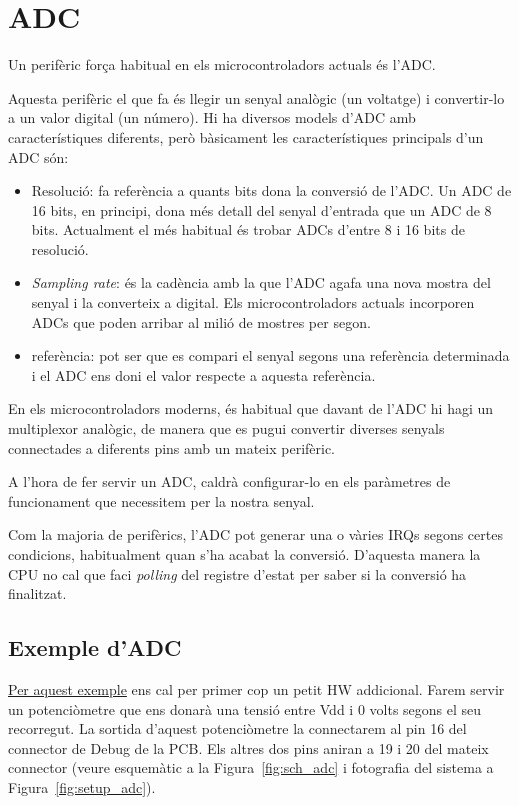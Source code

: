 \chapter{ADC}
\label{sub:ADC}
Un perifèric força habitual en els microcontroladors actuals és l'\gls{ADC}.

Aquesta perifèric el que fa és llegir un senyal analògic (un voltatge) i convertir-lo a un valor digital (un número). Hi ha diversos models d'\gls{ADC} amb característiques diferents, però bàsicament les característiques principals d'un ADC són:
\begin{itemize}
 \item Resolució: fa referència a quants bits dona la conversió de l'ADC. Un ADC de 16 bits, en principi, dona més detall del senyal d'entrada que un ADC de 8 bits. Actualment el més habitual és trobar ADCs d'entre 8 i 16 bits de resolució.
 \item {\em Sampling rate}: és la cadència amb la que l'ADC agafa una nova mostra del senyal i la converteix a digital. Els microcontroladors actuals incorporen ADCs que poden arribar al milió de mostres per segon.
 \item referència: pot ser que es compari el senyal segons una referència determinada i el ADC ens doni el valor respecte a aquesta referència.
\end{itemize}

En els microcontroladors moderns, és habitual que davant de l'ADC hi hagi un multiplexor analògic, de manera que es pugui convertir diverses senyals connectades a diferents pins amb un mateix perifèric.

A l'hora de fer servir un \gls{ADC}, caldrà configurar-lo en els paràmetres de funcionament que necessitem per la nostra senyal.

Com la majoria de perifèrics, l'ADC pot generar una o vàries \glspl{IRQ} segons certes condicions, habitualment quan s'ha acabat la conversió. D'aquesta manera la CPU no cal que faci {\em polling} del registre d'estat per saber si la conversió ha finalitzat.

\section{Exemple d'ADC}
\label{sub:ADC_example}
\href{https://github.com/mariusmm/cursembedded/tree/master/Simplicity/ADC_1s}{Per aquest exemple} ens cal per primer cop un petit HW addicional. Farem servir un potenciòmetre que ens donarà una tensió entre Vdd i 0 volts segons el seu recorregut. La sortida d'aquest potenciòmetre la connectarem al pin 16 del connector de Debug de la PCB. Els altres dos pins aniran a 19 i 20 del mateix connector (veure esquemàtic a la Figura~\ref{fig:sch_adc} i fotografia del sistema a Figura~\ref{fig:setup_adc}).

